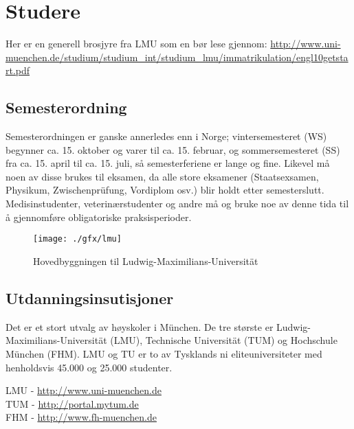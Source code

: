 \chapter{Studere}
Her er en generell brosjyre fra LMU som en bør lese gjennom:
\url{http://www.uni-muenchen.de/studium/studium_int/studium_lmu/immatrikulation/engl10getstart.pdf}


\section{Semesterordning}
Semesterordningen er ganske annerledes enn i Norge; vintersemesteret (WS) begynner ca. 15. oktober og varer til ca. 15. februar, og sommersemesteret (SS) fra ca. 15. april til ca. 15. juli, så semesterferiene er lange og fine. Likevel må noen av disse brukes til eksamen, da alle store eksamener (Staatsexsamen, Physikum, Zwischenprüfung, Vordiplom osv.) blir holdt etter semesterslutt. Medisinstudenter, veterinærstudenter og andre må og bruke noe av denne tida til å gjennomføre obligatoriske praksisperioder.

\begin{figure}[h]
\center
\texttt{[image: ./gfx/lmu]}
\caption{Hovedbyggningen til Ludwig-Maximilians-Universität}
\end{figure}

\section{Utdanningsinsutisjoner}
Det er et stort utvalg av høyskoler i München. De tre største er Ludwig-Maximilians-Universität (LMU), Technische Universität (TUM) og Hochschule München (FHM). LMU og TU er to av Tysklands ni eliteuniversiteter med henholdsvis 45.000 og 25.000 studenter.


LMU - \url{http://www.uni-muenchen.de}\\
TUM - \url{http://portal.mytum.de}\\
FHM - \url{http://www.fh-muenchen.de}\\

